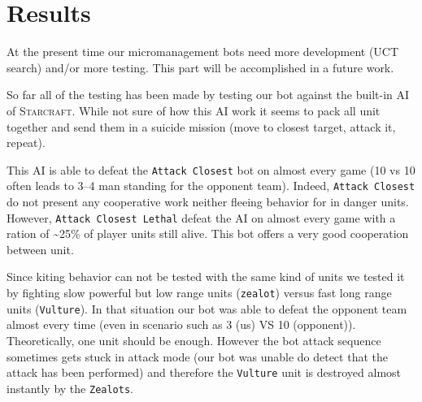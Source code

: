\section{Results}

At the present time our micromanagement bots need more development (UCT search) and/or more testing. This part will be accomplished in a future work.

So far all of the testing has been made by testing our bot against the built-in AI of \textsc{Starcraft}. While not sure of how this AI work it seems to pack all unit together and send them in a suicide mission (move to closest target, attack it, repeat). 

This AI is able to defeat the \texttt{Attack Closest} bot on almost every game (10 vs 10 often leads to 3--4 man standing for the opponent team).
Indeed, \texttt{Attack Closest} do not present any cooperative work neither fleeing behavior for in danger units. However, \texttt{Attack Closest Lethal} defeat the AI on almost every game with a ration of \textasciitilde25\% of player units still alive. This bot offers a very good cooperation between unit.

Since kiting behavior can not be tested with the same kind of units we tested it by fighting slow powerful but low range units (\texttt{zealot}) versus fast long range units (\texttt{Vulture}). 
In that situation our bot was able to defeat the opponent team almost every time (even in scenario such as 3 (us) VS 10 (opponent)). 
Theoretically, one unit should be enough. However the bot attack sequence sometimes gets stuck in attack mode (our bot was unable do detect that the attack has been performed) and therefore the \texttt{Vulture} unit is destroyed almost instantly by the \texttt{Zealots}.
